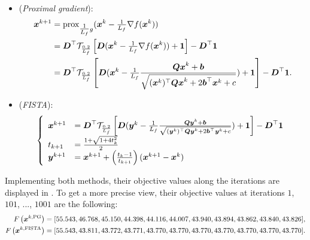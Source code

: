 \begin{itemize}
    \item (\emph{Proximal gradient}):
    \begin{align*}
    \begin{split}
        \boldsymbol x^{k+1} &= \operatorname{prox}_{{\textstyle\frac{1}{L_f}}g} (\boldsymbol x^k - {\textstyle\frac{1}{L_f}} \nabla f(\boldsymbol x^k)) \\ 
        &=  \boldsymbol D^\top 
       \mathcal T_{\frac{0.2}{L_f}} \left[ \boldsymbol D(\boldsymbol x^k - {\textstyle\frac{1}{L_f}} \nabla 
        f(\boldsymbol x^k) ) + \boldsymbol 1 \right]  - \boldsymbol D^\top  \boldsymbol 1    \\
        &= \boldsymbol D^\top  \mathcal T_{\frac{0.2}{L_f}} \left[ 
        \boldsymbol D(\boldsymbol x^k - {\textstyle\frac{1}{L_f}} \frac{\boldsymbol{Qx}^k+\boldsymbol b}{\sqrt{(\boldsymbol x^k)^\top 
        \boldsymbol{Qx}^k + 2 \boldsymbol b^\top \boldsymbol x^k + c}} ) + \boldsymbol 1 \right] - \boldsymbol D^\top \boldsymbol 1 .
    \end{split}
    \end{align*}
    
    \item (\emph{FISTA}):
      \begin{align*}
    \begin{split}
    \left\{
    \begin{array}{lll}
        \boldsymbol x^{k+1} &= \boldsymbol D^\top  \mathcal T_{\frac{0.2}{L_f}} \left[ 
        \boldsymbol D(\boldsymbol y^k - {\textstyle\frac{1}{L_f}} \frac{\boldsymbol{Qy}^k+\boldsymbol b}{\sqrt{(\boldsymbol y^k)^\top 
        \boldsymbol{Qy}^k + 2 \boldsymbol b^\top \boldsymbol y^k + c}} ) + \boldsymbol 1 \right] - \boldsymbol D^\top \boldsymbol 1 \\
        t_{k+1} &= \frac{1+\sqrt{1+4t_k^2}}{2} \\
        \boldsymbol y^{k+1} &= \boldsymbol x^{k+1} + \left( 
        \frac{t_k-1}{t_{k+1}} \right) (\boldsymbol x^{k+1}- \boldsymbol x^k)
    \end{array}
    \right.
    \end{split}
    \end{align*}
\end{itemize}
Implementing both methods, their objective values along the iterations are displayed in . To get a more precise view, their objective values at iterations $1$, $101$, ..., $1001$ are the following:
\begin{align*}
	F\left(\boldsymbol x^{k,\text{PG}}\right)&= [55.543, 46.768, 45.150 , 44.398, 44.116, 44.007, 43.940 , 43.894,
       43.862, 43.840 , 43.826],\\
       F\left(\boldsymbol x^{k,\text{FISTA}}\right)&= [55.543, 43.811, 43.772, 43.771, 43.770 , 43.770 , 43.770 , 43.770 ,
       43.770 , 43.770 , 43.770 ]  .     
\end{align*}
